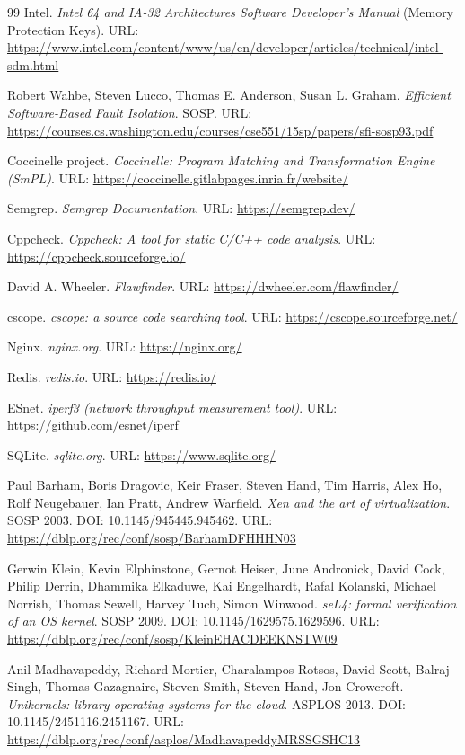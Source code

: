 \documentclass[UTF8,a4paper,12pt,twoside]{ctexart}  %
\begin{document}
\begin{thebibliography}{99}
 Intel. \emph{Intel 64 and IA-32 Architectures Software
Developer's Manual} (Memory Protection Keys). URL:
\url{https://www.intel.com/content/www/us/en/developer/articles/technical/intel-sdm.html}

 Robert Wahbe, Steven Lucco, Thomas E. Anderson, Susan L. Graham.
\emph{Efficient Software-Based Fault Isolation}. SOSP.
URL:
\url{https://courses.cs.washington.edu/courses/cse551/15sp/papers/sfi-sosp93.pdf}

 Coccinelle project. \emph{Coccinelle: Program Matching and
Transformation Engine (SmPL)}. URL:
\url{https://coccinelle.gitlabpages.inria.fr/website/}

 Semgrep. \emph{Semgrep Documentation}. URL:
\url{https://semgrep.dev/}

 Cppcheck. \emph{Cppcheck: A tool for static C/C++ code
analysis}. URL: \url{https://cppcheck.sourceforge.io/}

 David A. Wheeler. \emph{Flawfinder}. URL:
\url{https://dwheeler.com/flawfinder/}

 cscope. \emph{cscope: a source code searching tool}. URL:
\url{https://cscope.sourceforge.net/}

 Nginx. \emph{nginx.org}. URL: \url{https://nginx.org/}

 Redis. \emph{redis.io}. URL: \url{https://redis.io/}

 ESnet. \emph{iperf3 (network throughput measurement tool)}.
URL: \url{https://github.com/esnet/iperf}

 SQLite. \emph{sqlite.org}. URL: \url{https://www.sqlite.org/}

 Paul Barham, Boris Dragovic, Keir Fraser, Steven Hand, Tim
Harris, Alex Ho, Rolf Neugebauer, Ian Pratt, Andrew Warfield. \emph{Xen
and the art of virtualization}. SOSP 2003. DOI: 10.1145/945445.945462.
URL: \url{https://dblp.org/rec/conf/sosp/BarhamDFHHHN03}

 Gerwin Klein, Kevin Elphinstone, Gernot Heiser, June Andronick,
David Cock, Philip Derrin, Dhammika Elkaduwe, Kai Engelhardt, Rafal
Kolanski, Michael Norrish, Thomas Sewell, Harvey Tuch, Simon Winwood.
\emph{seL4: formal verification of an OS kernel}. SOSP 2009. DOI:
10.1145/1629575.1629596. URL:
\url{https://dblp.org/rec/conf/sosp/KleinEHACDEEKNSTW09}

 Anil Madhavapeddy, Richard Mortier, Charalampos Rotsos, David
Scott, Balraj Singh, Thomas Gazagnaire, Steven Smith, Steven Hand, Jon
Crowcroft. \emph{Unikernels: library operating systems for the cloud}.
ASPLOS 2013. DOI: 10.1145/2451116.2451167. URL:
\url{https://dblp.org/rec/conf/asplos/MadhavapeddyMRSSGSHC13}


\end{thebibliography}
\end{document}
